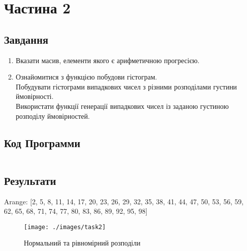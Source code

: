 \section{Частина 2}
\label{sec:task2}

\subsection{Завдання}
\label{subsec:task2_task}

\begin{enumerate}
    \item
          Вказати масив, елементи якого є арифметичною прогресією.

    \item
          Ознайомитися з функцією побудови гістограм. \\
          Побудувати гістограми випадкових чисел з різними розподілами густини ймовірності. \\
          Використати функції генерації випадкових чисел із заданою густиною розподілу ймовірностей.
\end{enumerate}

\subsection{Код Программи}
\label{subsec:task2_code}
\inputminted{python}{../src/task2.py}

\subsection{Результати}
\label{subsec:task2_results}

Arange:
[2, 5, 8, 11, 14, 17, 20, 23, 26, 29, 32, 35, 38, 41, 44, 47, 50, 53,
56, 59, 62, 65, 68, 71, 74, 77, 80, 83, 86, 89, 92, 95, 98]

\begin{figure}[!ht]
    \centering
    \texttt{[image: ./images/task2]}
    \caption{Нормальний та рівномірний розподіли}
    \label{fig:normal_and_uniform_distribution}
\end{figure}
